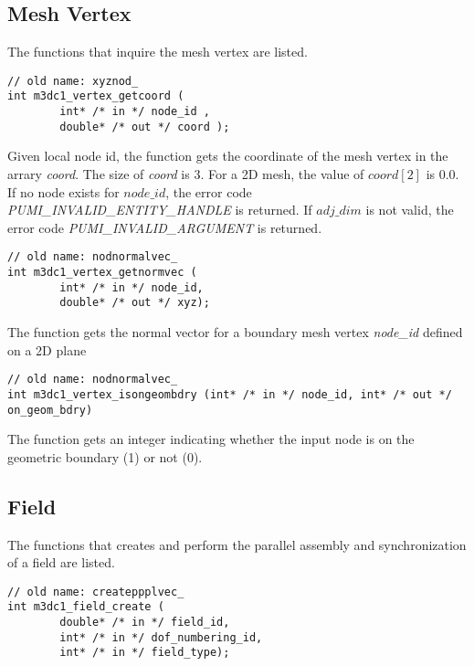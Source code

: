 \subsection{Mesh Vertex}
The functions that inquire the mesh vertex are listed.
\begin{verbatim}
// old name: xyznod_
int m3dc1_vertex_getcoord (
        int* /* in */ node_id , 
        double* /* out */ coord ); 
\end{verbatim}\vspace{-.5cm}\hspace{1cm}
Given local node id, the function gets the coordinate of the mesh vertex in the arrary \textit{coord}. 
The size of \textit{coord} is 3. For a 2D mesh, the value of $coord[2]$ is 0.0. If no node exists for $node\_id$, the error code \emph{PUMI\_INVALID\_ENTITY\_HANDLE} is returned. If $adj\_dim$ is not valid, the error code \emph{PUMI\_INVALID\_ARGUMENT} is returned. 

\begin{verbatim}
// old name: nodnormalvec_
int m3dc1_vertex_getnormvec (
        int* /* in */ node_id, 
        double* /* out */ xyz);
\end{verbatim}\vspace{-.5cm}\hspace{1cm}

    The function gets the normal vector for a boundary mesh vertex \textit{node\_id} defined on a 2D plane

\begin{verbatim}
// old name: nodnormalvec_
int m3dc1_vertex_isongeombdry (int* /* in */ node_id, int* /* out */ on_geom_bdry)
\end{verbatim}\vspace{-.5cm}\hspace{1cm}

    The function gets an integer indicating whether the input node is on the geometric boundary (1) or not (0).

\subsection{Field}
The functions that creates and perform the parallel assembly and synchronization of  a field are listed. 
\begin{verbatim}
// old name: createppplvec_
int m3dc1_field_create (
        double* /* in */ field_id, 
        int* /* in */ dof_numbering_id, 
        int* /* in */ field_type); 
\end{verbatim}\vspace{-.5cm}\hspace{1cm}

